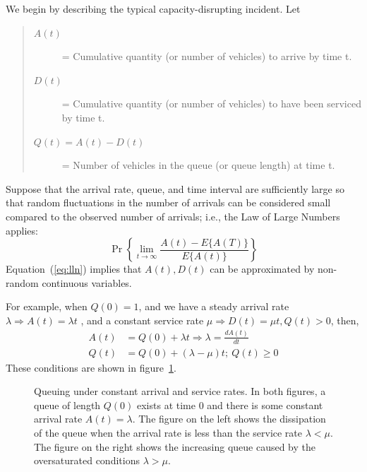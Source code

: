 \documentclass[12pt]{report}
\newcommand{\inputTikZ}[1]{%
    \begin{singlespace}
    \end{singlespace}
  }
\newcommand{\inputTikZ}[1]{%
    \begin{singlespace}
    \beginpgfgraphicnamed{#1-external}%
    \endpgfgraphicnamed%
    \end{singlespace}
  }
\newcounter{time}
\newcounter{space}
\begin{document}
We begin by describing the typical capacity-disrupting incident. Let
\begin{quote}
\begin{description}
\item[$A(t)$] = Cumulative quantity (or number of vehicles) to arrive
  by time t.
\item[$D(t)$] = Cumulative quantity (or number of vehicles) to have
  been serviced by time t.
\item[$Q(t)=A(t)-D(t)$] = Number of vehicles in the queue (or queue
  length) at time t.
\end{description}
\end{quote}
Suppose that the arrival rate, queue, and time interval are
sufficiently large so that random fluctuations in the number of
arrivals can be considered small compared to the observed number of
arrivals; i.e., the Law of Large Numbers applies:
\begin{equation}
  \label{eq:lln}
  \Pr\left\{\lim_{t\to\infty}\frac{A(t)-E\{A(T)\}}{E\{A(t)\}}\right\} 
\end{equation}
Equation~(\ref{eq:lln}) implies that $A(t), D(t)$ can be approximated by
non-random continuous variables.

For example, when $Q(0)=1$, and we have a steady arrival rate $\lambda
\Rightarrow A(t) = \lambda t$ , and a constant service rate $\mu \Rightarrow D(t)
= \mu t, Q(t)>0$, then, 
\begin{align*}
  \label{eq:arrival-and-queues}
  A(t) & = Q(0) + \lambda t \Rightarrow \lambda = \frac{dA(t)}{dt}\\
  Q(t) & = Q(0) + (\lambda - \mu ) t; \: Q(t) \ge 0
\end{align*}
These conditions are shown in figure~\ref{fig:queuing-constant-rates}.
\begin{figure}[tbp]
  \begin{center}
    \inputTikZ{figs/queuing-undersat-and-oversat}
    \caption[Queuing under constant arrival and service rates]{Queuing
      under constant arrival and service rates.  In both figures, a
      queue of length $Q(0)$ exists at time 0 and there is some
      constant arrival rate $A(t)=\lambda$.  The figure on the left
      shows the dissipation of the queue when the arrival rate is less
      than the service rate $\lambda<\mu$.  The figure on the right
      shows the increasing queue caused by the oversaturated conditions
      $\lambda>\mu$.}
    \label{fig:queuing-constant-rates}
  \end{center}
\end{figure}
 
\end{document}
